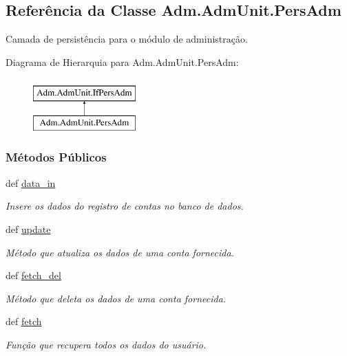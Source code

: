 \hypertarget{classAdm_1_1AdmUnit_1_1PersAdm}{\subsection{Referência da Classe Adm.\-Adm\-Unit.\-Pers\-Adm}
\label{classAdm_1_1AdmUnit_1_1PersAdm}
}


Camada de persistência para o módulo de administração.  


Diagrama de Hierarquia para Adm.\-Adm\-Unit.\-Pers\-Adm\-:\begin{figure}[H]
\begin{center}
\leavevmode
\includegraphics[height=2.000000cm]{dc/d1a/classAdm_1_1AdmUnit_1_1PersAdm}
\end{center}
\end{figure}
\subsubsection*{Métodos Públicos}
\begin{DoxyCompactItemize}
\item 
def \hyperlink{classAdm_1_1AdmUnit_1_1PersAdm_aef8c5933d2de37ac9b210a6b4ea7db5f}{data\-\_\-in}
\begin{DoxyCompactList}\small\item\em Insere os dados do registro de contas no banco de dados. \end{DoxyCompactList}\item 
def \hyperlink{classAdm_1_1AdmUnit_1_1PersAdm_a3d9372eca5d134e3c2125c40bf2147a3}{update}
\begin{DoxyCompactList}\small\item\em Método que atualiza os dados de uma conta fornecida. \end{DoxyCompactList}\item 
def \hyperlink{classAdm_1_1AdmUnit_1_1PersAdm_aa02d44b8f34bebc0e82133fd54da0c37}{fetch\-\_\-del}
\begin{DoxyCompactList}\small\item\em Método que deleta os dados de uma conta fornecida. \end{DoxyCompactList}\item 
def \hyperlink{classAdm_1_1AdmUnit_1_1PersAdm_a021e43040d51fa147a42018ced240a84}{fetch}
\begin{DoxyCompactList}\small\item\em Função que recupera todos os dados do usuário. \end{DoxyCompactList}\end{DoxyCompactItemize}


